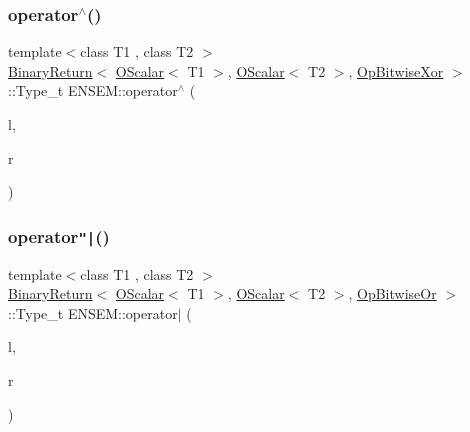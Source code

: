 \mbox{\label{group__obsscalar_gaa01a2cce660b21ea1e2ea9a876a1cd03}} 
\subsubsection{\texorpdfstring{operator$^\wedge$()}{operator^()}}
{\footnotesize\ttfamily template$<$class T1 , class T2 $>$ \\
\mbox{\hyperlink{structENSEM_1_1BinaryReturn}{Binary\+Return}}$<$ \mbox{\hyperlink{classENSEM_1_1OScalar}{O\+Scalar}}$<$ T1 $>$, \mbox{\hyperlink{classENSEM_1_1OScalar}{O\+Scalar}}$<$ T2 $>$, \mbox{\hyperlink{structENSEM_1_1OpBitwiseXor}{Op\+Bitwise\+Xor}} $>$\+::Type\+\_\+t E\+N\+S\+E\+M\+::operator$^\wedge$ (\begin{DoxyParamCaption}\item[{const \mbox{\hyperlink{classENSEM_1_1OScalar}{O\+Scalar}}$<$ T1 $>$ \&}]{l,  }\item[{const \mbox{\hyperlink{classENSEM_1_1OScalar}{O\+Scalar}}$<$ T2 $>$ \&}]{r }\end{DoxyParamCaption})\hspace{0.3cm}{\ttfamily [inline]}}

\mbox{\label{group__obsscalar_ga9243675542e15046a4e7b9f570ba66d1}} 
\subsubsection{\texorpdfstring{operator\texttt{"|}()}{operator|()}}
{\footnotesize\ttfamily template$<$class T1 , class T2 $>$ \\
\mbox{\hyperlink{structENSEM_1_1BinaryReturn}{Binary\+Return}}$<$ \mbox{\hyperlink{classENSEM_1_1OScalar}{O\+Scalar}}$<$ T1 $>$, \mbox{\hyperlink{classENSEM_1_1OScalar}{O\+Scalar}}$<$ T2 $>$, \mbox{\hyperlink{structENSEM_1_1OpBitwiseOr}{Op\+Bitwise\+Or}} $>$\+::Type\+\_\+t E\+N\+S\+E\+M\+::operator$\vert$ (\begin{DoxyParamCaption}\item[{const \mbox{\hyperlink{classENSEM_1_1OScalar}{O\+Scalar}}$<$ T1 $>$ \&}]{l,  }\item[{const \mbox{\hyperlink{classENSEM_1_1OScalar}{O\+Scalar}}$<$ T2 $>$ \&}]{r }\end{DoxyParamCaption})\hspace{0.3cm}{\ttfamily [inline]}}

